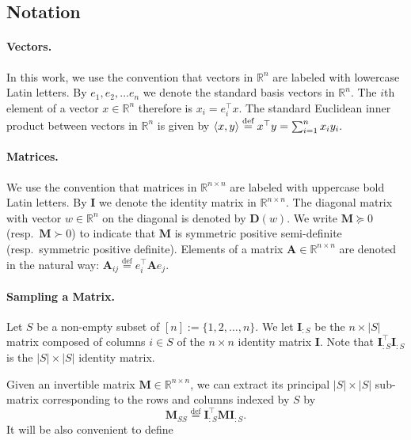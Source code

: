 \documentclass[11pt]{article}
\newcommand{\R}{\mathbb{R}}
\newcommand{\bI}{\mathbf{I}}
\newcommand{\bM}{\mathbf{M}}
\newcommand{\eqdef}{\overset{\text{def}}{=}}
\begin{document}
	\subsection{Notation}
	
		\paragraph{Vectors.}
		In this work, we use the convention that vectors in $\mathbb{R}^n$ are labeled with lowercase Latin letters.	By $e_1, e_2, \dots e_n$ we denote the standard basis vectors in $\mathbb{R}^n$. The $i$th element of a vector $x \in \mathbb{R}^n$ therefore is $x_i= e_i^\top x$.
		The standard Euclidean inner product between vectors in $\mathbb{R}^n$ is given by
		$\braket{x,y} \eqdef x^\top y=\sum_{i=1}^{n}x_iy_i.$
	
		\paragraph{Matrices.} 
		We use the convention that matrices in $\mathbb{R}^{n\times n}$ are labeled with uppercase bold Latin letters.	By $\mathbf{I}$ we denote the identity matrix in $\mathbb{R}^{n\times n}$. The diagonal matrix with vector $w \in \mathbb{R}^n$  on the diagonal is denoted by $\mathbf{D}(w)$. We write $\mathbf{M} \succeq 0$ (resp.\ $\mathbf{M} \succ 0$) to indicate that $\mathbf{M}$ is symmetric positive semi-definite (resp.\ symmetric positive definite). Elements of a matrix $\mathbf{A} \in \mathbb{R}^{n\times n}$ are denoted in the natural way: $\mathbf{A}_{ij}\eqdef  e_i^\top \mathbf{A}e_j$.


		\paragraph{Sampling a Matrix.} 
		Let $S$ be a non-empty subset of  $[n]:=\{1,2, \dots, n\}$.
		We let $\bI_{:S}$ be the $n \times |S|$ matrix  composed of columns $i \in S$ of the $n\times n$ identity matrix $\bI$. Note that $\bI_{:S}^\top \bI_{:S}$ is the $|S|\times |S|$ identity matrix.

		 Given an invertible matrix $\bM\in \R^{n\times n}$, we can extract its principal  $|S| \times |S|$ sub-matrix  corresponding to the rows and columns indexed by $S$ by
			\begin{equation} \label{eq:smaller_splice}
				\mathbf{M}_{SS} \eqdef \bI_{:S}^\top \mathbf{M} \bI_{:S}.
			\end{equation}	
		It will be also convenient to  define
\end{document}
